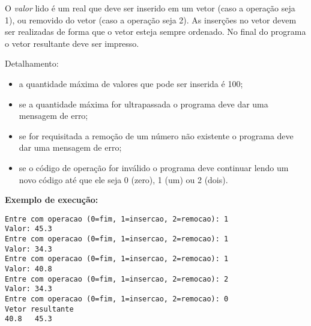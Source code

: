 \begin{enumerate}
O {\em valor} lido é um real que deve ser inserido em um vetor (caso a
operação seja 1), ou removido do vetor (caso a operação seja 2).   As
inserções no vetor devem ser realizadas de forma que o vetor esteja sempre
ordenado.   No final do programa o vetor resultante deve ser impresso.

Detalhamento:
\begin{itemize}
\item a quantidade máxima de valores que pode  ser inserida é 100;
\item se a quantidade máxima for ultrapassada o programa deve dar uma
mensagem de erro;
\item se for requisitada a remoção de um número não existente o programa
  deve dar uma mensagem de erro;
\item se o código de operação for inválido o programa deve continuar lendo
um novo código até que ele seja 0 (zero), 1 (um) ou 2 (dois).
\end{itemize}

\noindent
{\bf Exemplo de execução: }
\begin{small}
\begin{verbatim}
Entre com operacao (0=fim, 1=insercao, 2=remocao): 1 
Valor: 45.3 
Entre com operacao (0=fim, 1=insercao, 2=remocao): 1 
Valor: 34.3 
Entre com operacao (0=fim, 1=insercao, 2=remocao): 1 
Valor: 40.8
Entre com operacao (0=fim, 1=insercao, 2=remocao): 2 
Valor: 34.3
Entre com operacao (0=fim, 1=insercao, 2=remocao): 0
Vetor resultante
40.8   45.3 
\end{verbatim}
\end{small}


\end{enumerate}

